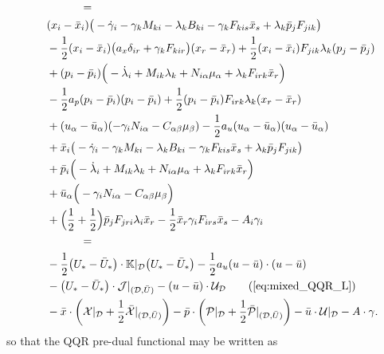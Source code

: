 \documentclass[11pt]{article}
\newcommand{\K}{\mathbb{K}}
\newcommand{\half}{\frac{1}{2}}
\newcommand{\calP}{{\cal P}}
\newcommand{\calU}{{\cal U}}
\newcommand{\calX}{{\cal X}}
\newcommand{\dee}{\mathcal{D}}
\begin{document}
\begin{subequations}
\begin{align}
    & \qquad \qquad = \notag \\
    & \quad (x_i - \bar{x}_i) \big( - \dot{\gamma}_i - \gamma_k M_{ki} - \lambda_k B_{ki} - \gamma_k F_{kis} \bar{x}_s + \lambda_k \bar{p}_j F_{jik} \big) \notag \\
      & \quad - \half (x_i - \bar{x}_i) \big( a_x \delta_{ir} + \gamma_k F_{kir} \big) (x_r - \bar{x}_r) + \half (x_i - \bar{x}_i) F_{jik} \lambda_k (p_j - \bar{p}_j) \notag \\
      & \quad  + (p_i - \bar{p}_i) \Big( - \dot{\lambda}_i + M_{ik} \lambda_k + N_{i \alpha} \mu_\alpha + \lambda_k F_{irk} \bar{x}_r \Big) \notag \\
      & \quad  - \half a_p (p_i - \bar{p}_i) (p_i - \bar{p}_i) + \half (p_ i - \bar{p}_i) F_{irk} \lambda_k (x_r - \bar{x}_r) \notag\\
      & \quad  + (u_\alpha - \bar{u}_\alpha) (- \gamma_i N_{i \alpha} - C_{\alpha \beta} \mu_\beta ) - \half a_u (u_\alpha - \bar{u}_\alpha) (u_\alpha - \bar{u}_\alpha) \notag\\
      & \quad  + \bar{x}_i \big( - \dot{\gamma}_i - \gamma_k M_{ki} - \lambda_k B_{ki} - \gamma_k F_{kis} \bar{x}_s + \lambda_k \bar{p}_j F_{jik} \big) \notag \\
      & \quad  + \bar{p}_i \Big( - \dot{\lambda}_i + M_{ik} \lambda_k + N_{i \alpha} \mu_\alpha + \lambda_k F_{irk} \bar{x}_r \Big) \notag \\
      & \quad + \bar{u}_\alpha \Big( - \gamma_i N_{i \alpha} - C_{\alpha \beta} \mu_\beta \Big) \notag\\
      & \quad  + \Big( \half + \half \Big) \bar{p}_j F_{jri}\lambda_i  \bar{x}_r - \half \bar{x}_r \gamma_i F_{irs} \bar{x}_s - A_i \gamma_i  \notag \\ 
      & \qquad \qquad = \notag \\
      & \quad - \half \big( U_* - \bar{U}_* \big) \cdot \K|_\dee \big( U_* - \bar{U}_* \big) - \half a_u (u - \bar{u})\cdot (u - \bar{u}) \notag\\
      & \quad - \big( U_* - \bar{U}_* \big) \cdot \mathcal{J}|_{(\dee,\bar{U})} - (u - \bar{u}) \cdot \mathcal{U}_\dee \tag{\ref{eq:mixed_QQR_L}}\\
      & \quad - \bar{x} \cdot \left( \calX |_\dee + \half \bar{\calX}|_{(\dee, \bar{U})} \right) - \bar{p} \cdot \left( \calP |_\dee + \half \bar{\calP}|_{(\dee, \bar{U})} \right) - \bar{u} \cdot \calU |_\dee - A \cdot \gamma.\notag
\end{align}
\end{subequations}
 so that the QQR pre-dual functional may be written as
\end{document}
